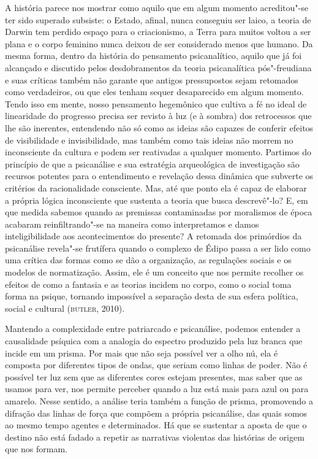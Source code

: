 A história parece nos mostrar como aquilo que em algum momento
acreditou"-se ter sido superado subsiste: o Estado, afinal, nunca
conseguiu ser laico, a teoria de Darwin tem perdido espaço para o
criacionismo, a Terra para muitos voltou a ser plana e o corpo feminino
nunca deixou de ser considerado menos que humano. Da mesma forma, dentro
da história do pensamento psicanalítico, aquilo que já foi alcançado e
discutido pelos desdobramentos da teoria psicanalítica pós"-freudiana e
suas críticas também não garante que antigos pressupostos sejam
retomados como verdadeiros, ou que eles tenham sequer desaparecido em
algum momento. Tendo isso em mente, nosso pensamento hegemônico que
cultiva a fé no ideal de linearidade do progresso precisa ser revisto à
luz (e à sombra) dos retrocessos que lhe são inerentes, entendendo não
só como as ideias são capazes de conferir efeitos de visibilidade e
invisibilidade, mas também como tais ideias não morrem no inconsciente
da cultura e podem ser reativadas a qualquer momento. Partimos do
princípio de que a psicanálise e sua estratégia arqueológica de
investigação são recursos potentes para o entendimento e revelação dessa
dinâmica que subverte os critérios da racionalidade consciente. Mas, até
que ponto ela é capaz de elaborar a própria lógica inconsciente que
sustenta a teoria que busca descrevê"-lo? E, em que medida sabemos quando
as premissas contaminadas por moralismos de época acabaram
reinfiltrando"-se na maneira como interpretamos e damos inteligibilidade
aos acontecimentos do presente? A retomada dos primórdios da psicanálise
revela"-se frutífera quando o complexo de Édipo passa a ser lido como uma
crítica das formas como se dão a organização, as regulações sociais e os
modelos de normatização. Assim, ele é um conceito que nos permite
recolher os efeitos de como a fantasia e as teorias incidem no corpo,
como o social toma forma na psique, tornando impossível a separação
desta de sua esfera política, social e cultural (\textsc{butler}, 2010).

Mantendo a complexidade entre patriarcado e psicanálise, podemos
entender a causalidade psíquica com a analogia do espectro produzido
pela luz branca que incide em um prisma. Por mais que não seja possível
ver a olho nú, ela é composta por diferentes tipos de ondas, que seriam
como linhas de poder. Não é possível ter luz sem que as diferentes cores
estejam presentes, mas saber que as usamos para ver, nos permite
perceber quando a luz está mais para azul ou para amarelo. Nesse
sentido, a análise teria também a função de prisma, promovendo a
difração das linhas de força que compõem a própria psicanálise, das
quais somos ao mesmo tempo agentes e determinados. Há que se sustentar a
aposta de que o destino não está fadado a repetir as narrativas
violentas das histórias de origem que nos formam.

